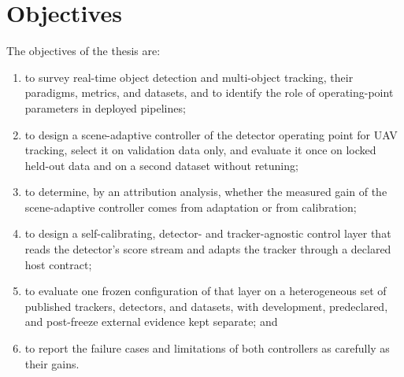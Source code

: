 \section{Objectives}
The objectives of the thesis are:
\begin{enumerate}
\item to survey real-time object detection and multi-object tracking, their paradigms, metrics, and datasets, and to identify the role of operating-point parameters in deployed pipelines;
\item to design a scene-adaptive controller of the detector operating point for UAV tracking, select it on validation data only, and evaluate it once on locked held-out data and on a second dataset without retuning;
\item to determine, by an attribution analysis, whether the measured gain of the scene-adaptive controller comes from adaptation or from calibration;
\item to design a self-calibrating, detector- and tracker-agnostic control layer that reads the detector's score stream and adapts the tracker through a declared host contract;
\item to evaluate one frozen configuration of that layer on a heterogeneous set of published trackers, detectors, and datasets, with development, predeclared, and post-freeze external evidence kept separate; and
\item to report the failure cases and limitations of both controllers as carefully as their gains.
\end{enumerate}

